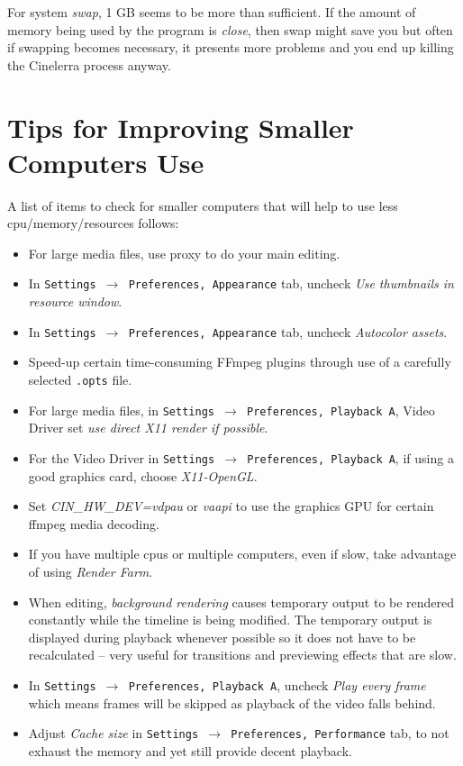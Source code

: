 For system \textit{swap}, 1 GB seems to be more than sufficient.  If the amount of memory being used by the program is \textit{close}, then swap might save you but often if swapping becomes necessary, it presents more problems and you end up killing the Cinelerra process anyway.

\section{Tips for Improving Smaller Computers Use}%
\label{sec:tips_improving_smaller_computers}

A list of items to check for smaller computers that will help to use less cpu/memory/resources follows:

\begin{itemize}
	\item For large media files, use proxy to do your main editing.
	\item In \texttt{Settings $\rightarrow$ Preferences, Appearance} tab, uncheck \textit{Use thumbnails in resource window}.
	\item In \texttt{Settings $\rightarrow$ Preferences, Appearance} tab, uncheck \textit{Autocolor assets}.
	\item  Speed-up certain time-consuming FFmpeg plugins through use of a carefully selected \texttt{.opts} file.
	\item For large media files, in \texttt{Settings $\rightarrow$ Preferences, Playback A}, Video Driver set \textit{use direct X11 render if possible}.
	\item For the Video Driver in \texttt{Settings $\rightarrow$ Preferences, Playback A}, if using a good graphics card, choose \textit{X11-OpenGL}.
	\item Set \textit{CIN\_HW\_DEV=vdpau} or \textit{vaapi} to use the graphics GPU for certain ffmpeg media decoding.
	\item If you have multiple cpus or multiple computers, even if slow, take advantage of using \textit{Render Farm}.
	\item When editing, \textit{background rendering} causes temporary output to be rendered constantly while the
	timeline is being modified. The temporary output is displayed during playback whenever possible so 
	it does not have to be recalculated -- very useful for transitions and previewing effects that are slow.
	\item In  \texttt{Settings $\rightarrow$ Preferences, Playback A}, uncheck \textit{Play every frame} which means frames will be skipped as playback of the video falls behind.
	\item Adjust \textit{Cache size} in \texttt{Settings $\rightarrow$ Preferences, Performance} tab, to not exhaust the memory and yet still provide decent playback.
\end{itemize}

